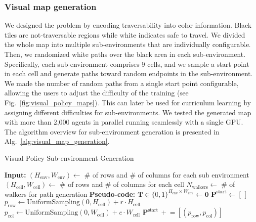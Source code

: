 \begin{appendices}
\subsubsection{Visual map generation}
We designed the problem by encoding traversability into color information.
Black tiles are not-traversable regions while white indicates safe to travel.
We divided the whole map into multiple sub-environments that are individually configurable. 
Then, we randomized white paths over the black area in each sub-environment.
Specifically, each sub-environment comprises 9 cells, and we sample a start point in each cell and generate paths toward random endpoints in the sub-environment.
We made the number of random paths from a single start point configurable, allowing the users to adjust the difficulty of the training (see Fig.~\ref{fig:visual_policy_maps}).
This can later be used for curriculum learning by assigning different difficulties for sub-environments.
We tested the generated map with more than 2,000 agents in parallel running seamlessly with a single GPU.
The algorithm overview for sub-environment generation is presented in Alg.~\ref{alg:visual_map_generation}.
\begin{algorithm}[!ht]
\centering
\footnotesize
\caption{Visual Policy Sub-environment Generation} 
\begin{algorithmic}[1]
\State \textbf{Input:}
\State $(H_\text{env}, W_\text{env}) \gets$ \# of rows and \# of columns for each sub environment
\State $(H_\text{cell}, W_\text{cell}) \gets$ \# of rows and \# of columns for each cell
\State $N_\text{walkers} \gets$ \# of walkers for path generation 
\State
\State \textbf{Pseudo-code:}
\State $\mathbf{T}\in\{0, 1\}^{H_\text{env}\times W_\text{env}} \gets \mathrm{\mathbf{0}}$ 
\State {}
\State $\mathbf{P}^\text{start} \gets [\,]$ 
    \State $p_\text{row} \gets \text{UniformSampling}(0, H_\text{cell}) + r \cdot H_\text{cell}$
    \State $p_\text{col} \gets \text{UniformSampling}(0, W_\text{cell}) + c \cdot W_\text{cell}$
    \State $\mathbf{P}^\text{start}\, \mathrel{+}= [(p_\text{row}, p_\text{col})]$ 
  \EndFor
\EndFor
\Statex


\end{algorithmic}
\end{algorithm}
\end{appendices}
